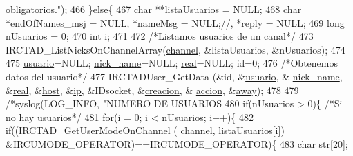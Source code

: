 \begin{DoxyCode}
{{{{{{{       obligatorios."});
466                         \}\textcolor{keywordflow}{else}\{
467                                 \textcolor{keywordtype}{char} **listaUsuarios = NULL;
468                                 \textcolor{keywordtype}{char} *endOfNames\_msj = NULL, *nameMsg = NULL;\textcolor{comment}{//, *reply = NULL;}
469                                 \textcolor{keywordtype}{long} nUsuarios = 0;
470                                 \textcolor{keywordtype}{int} i;
471 
472                                 \textcolor{comment}{/*Listamos usuarios de un canal*/}
473                                 IRCTAD\_ListNicksOnChannelArray(\hyperlink{_g-2361-06-_p1-_server_8c_a842ca2f026578e5c479c095ff3335969}{channel}, &listaUsuarios, &nUsuarios);
474 
475                                 \hyperlink{_g-2361-06-_p1-_server_8c_a0147a5b81499984f9cb00379a8cb84af}{usuario}=NULL; \hyperlink{_g-2361-06-_p1-_server_8c_aabbf66718cda228b924a4a9441eadf62}{nick\_name}=NULL; 
      \hyperlink{_g-2361-06-_p1-_server_8c_af832f551e1c343666c3d2a55834139a0}{real}=NULL; \textcolor{keywordtype}{id}=0;
476                                 \textcolor{comment}{/*Obtenemos datos del usuario*/}
477                                 IRCTADUser\_GetData (&\textcolor{keywordtype}{id}, &\hyperlink{_g-2361-06-_p1-_server_8c_a0147a5b81499984f9cb00379a8cb84af}{usuario}, &
      \hyperlink{_g-2361-06-_p1-_server_8c_aabbf66718cda228b924a4a9441eadf62}{nick\_name}, &\hyperlink{_g-2361-06-_p1-_server_8c_af832f551e1c343666c3d2a55834139a0}{real}, &\hyperlink{_g-2361-06-_p1-_server_8c_a1c2046dcb30a629d6d9f45ff8f403f12}{host}, &\hyperlink{_g-2361-06-_p1-_server_8c_afbc356cd0e25d1dbbece7c10fd025fa6}{ip}, &IDsocket, &\hyperlink{_g-2361-06-_p1-_server_8c_a26292066ca0d17922eadee4161542ab9}{creacion}, &
      \hyperlink{_g-2361-06-_p1-_server_8c_a93e785c991445d8b8ee99c2e51242d5a}{accion}, &\hyperlink{_g-2361-06-_p1-_server_8c_adf86742e21384f58f8999d8317e6a370}{away});
478 
479                                 \textcolor{comment}{/*syslog(LOG\_INFO, "NUMERO DE USUARIOS %
480                                 \textcolor{keywordflow}{if}(nUsuarios > 0)\{ \textcolor{comment}{/*Si no hay usuarios*/}
481                                         \textcolor{keywordflow}{for}(i = 0; i < nUsuarios; i++)\{
482                                                 \textcolor{keywordflow}{if}((IRCTAD\_GetUserModeOnChannel (
      \hyperlink{_g-2361-06-_p1-_server_8c_a842ca2f026578e5c479c095ff3335969}{channel}, listaUsuarios[i]) &IRCUMODE\_OPERATOR)==IRCUMODE\_OPERATOR)\{
483                                                         \textcolor{keywordtype}{char} str[20];
}}}}}}}
\end{DoxyCode}

